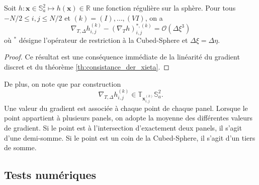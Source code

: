 \begin{proposition}
Soit $h : \mathbf{x} \in \mathbb{S}_a^2 \mapsto h(\mathbf{x}) \in \mathbb{R}$ une fonction régulière sur la sphère. Pour tous $-N/2 \leq i,j \leq N/2$ et $(k)=(I), \ldots , (VI)$, on a
\begin{equation}
\nabla_{T,\Delta} h_{i,j}^{(k)} - (\nabla_T h)^{*,(k)}_{i,j} = \mathcal{O} \left( \Delta \xi^3 \right)
\end{equation}
où $^*$ désigne l'opérateur de restriction à la Cubed-Sphere et $\Delta \xi = \Delta \eta$. 
\label{prop:accuracy_gradient}
\end{proposition}

\begin{proof}
Ce résultat est une conséquence immédiate de la linéarité du gradient discret et du théorème \ref{th:consistance_der_xieta}.
\end{proof}
De plus, on note que par construction
\begin{equation}
\nabla_{T,\Delta} h_{i,j}^{(k)} \in \mathbb{T}_{\mathbf{x}_{i,j}^{(k)}} \mathbb{S}_a^2.
\end{equation}
Une valeur du gradient est associée à chaque point de chaque panel. Lorsque le point appartient à plusieurs panels, on adopte la moyenne des différentes valeurs de gradient. Si le point est à l'intersection d'exactement deux panels, il s'agit d'une demi-somme. Si le point est un coin de la Cubed-Sphere, il s'agit d'un tiers de somme.















\subsection{Tests numériques}

